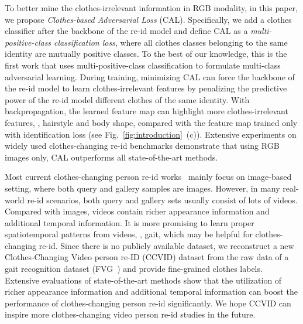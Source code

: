 \documentclass[10pt,twocolumn,letterpaper]{article}
\begin{document}
To better mine the clothes-irrelevant information in RGB modality, in this paper, we propose \emph{Clothes-based Adversarial Loss} (CAL).
Specifically, we add a clothes classifier after the backbone of the re-id model and define CAL as a \emph{multi-positive-class classification loss}, where all clothes classes belonging to the same identity are mutually positive classes.
To the best of our knowledge, this is the first work that uses multi-positive-class classification to formulate multi-class adversarial learning. 
During training, minimizing CAL can force the backbone of the re-id model to learn clothes-irrelevant features by penalizing the predictive power of the re-id model \wrt different clothes of the same identity.
With backpropagation, the learned feature map can highlight more clothes-irrelevant features, \eg, hairstyle and body shape, compared with the feature map trained only with identification loss (see Fig.~\ref{fig:introduction}~(c)).
Extensive experiments on widely used clothes-changing re-id benchmarks demonstrate that using RGB images only, CAL outperforms all state-of-the-art methods.

Most current clothes-changing person re-id works~\cite{Yang2019PRCC, Yu2020COCAS, Qian2020LTCC} mainly focus on image-based setting, where both query and gallery samples are images.
However, in many real-world re-id scenarios, both query and gallery sets usually consist of lots of videos.
Compared with images, videos contain richer appearance information and additional temporal information.
It is more promising to learn proper spatiotemporal patterns from videos, \eg, gait, which may be helpful for clothes-changing re-id.
Since there is no publicly available dataset, we reconstruct a new Clothes-Changing Video person re-ID (CCVID) dataset from the raw data of a gait recognition dataset (\ie FVG~\cite{Zhang2019Gait}) and provide fine-grained clothes labels.
Extensive evaluations of state-of-the-art methods show that the utilization of richer appearance information and additional temporal information can boost the performance of clothes-changing person re-id significantly.
We hope CCVID can inspire more clothes-changing video person re-id studies in the future.
\end{document}
